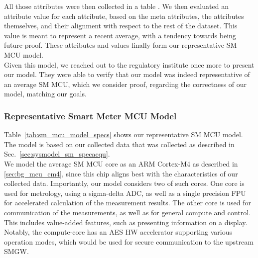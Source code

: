 \documentclass[english]{tudscrartcl}
\begin{document}
				All those attributes were then collected in a table \cite{ACAE-REPO}.
				We then evaluated an attribute value for each attribute, based on the meta attributes, the attributes themselves, and their alignment with respect to the rest of the dataset.
				This value is meant to represent a recent average, with a tendency towards being future-proof.
				These attributes and values finally form our representative \ac{SM} \ac{MCU} model.
				\\
				Given this model, we reached out to the regulatory institute once more to present our model.
				They were able to verify that our model was indeed representative of an average \ac{SM} \ac{MCU}, which we consider proof, regarding the correctness of our model, matching our goals.
				\\
			\subsubsection{Representative Smart Meter \ac{MCU} Model}
				\label{sec:sysmodel_sm_repsmmcumodel}
				Table~\ref{tab:sm_mcu_model_specs} shows our representative \ac{SM} \ac{MCU} model.
				The model is based on our collected data that was collected as described in Sec.~\ref{sec:sysmodel_sm_specacqu}.
				\\
				We model the average \ac{SM} \ac{MCU} core as an ARM Cortex-M4 as described in \ref{sec:bg_mcu_cm4}, since this chip aligns best with the characteristics of our collected data.
				Importantly, our model considers two of such cores.
				One core is used for metrology, using a sigma-delta ADC, as well as a single precision FPU for accelerated calculation of the measurement results.
				The other core is used for communication of the measurements, as well as for general compute and control.
				This includes value-added features, such as presenting information on a display.
				Notably, the compute-core has an AES \ac{HW} accelerator supporting various operation modes, which would be used for secure communication to the upstream \ac{SMGW}.
\end{document}
